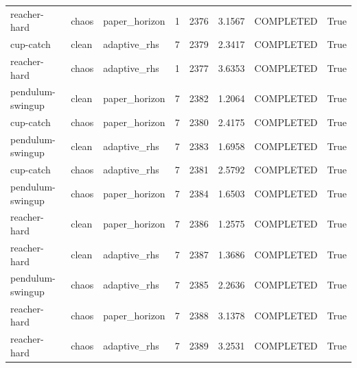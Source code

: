 \begin{tabular}{llllllll}
reacher-hard & chaos & paper\_horizon & 1 & 2376 & 3.1567 & COMPLETED & True \\
cup-catch & clean & adaptive\_rhs & 7 & 2379 & 2.3417 & COMPLETED & True \\
reacher-hard & chaos & adaptive\_rhs & 1 & 2377 & 3.6353 & COMPLETED & True \\
pendulum-swingup & clean & paper\_horizon & 7 & 2382 & 1.2064 & COMPLETED & True \\
cup-catch & chaos & paper\_horizon & 7 & 2380 & 2.4175 & COMPLETED & True \\
pendulum-swingup & clean & adaptive\_rhs & 7 & 2383 & 1.6958 & COMPLETED & True \\
cup-catch & chaos & adaptive\_rhs & 7 & 2381 & 2.5792 & COMPLETED & True \\
pendulum-swingup & chaos & paper\_horizon & 7 & 2384 & 1.6503 & COMPLETED & True \\
reacher-hard & clean & paper\_horizon & 7 & 2386 & 1.2575 & COMPLETED & True \\
reacher-hard & clean & adaptive\_rhs & 7 & 2387 & 1.3686 & COMPLETED & True \\
pendulum-swingup & chaos & adaptive\_rhs & 7 & 2385 & 2.2636 & COMPLETED & True \\
reacher-hard & chaos & paper\_horizon & 7 & 2388 & 3.1378 & COMPLETED & True \\
reacher-hard & chaos & adaptive\_rhs & 7 & 2389 & 3.2531 & COMPLETED & True \\
\bottomrule
\end{tabular}
